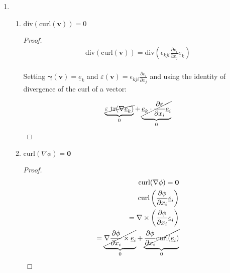 \begin{problem}
    \noindent
    \normalfont
\end{problem}
    \begin{enumerate}
        \item
        \begin{enumerate}
            
        \item $\text{div}(\text{curl}(\mathbf{v}))=0$
            \begin{proof}
                \begin{align}
                    \text{div}(\text{curl}(\mathbf{v}))=\text{div}\left( \epsilon_{kji}\frac{ \partial v_{i} }{ \partial x_{j} } \underline{e}_{k} \right) \\
                    \end{align}
                    
                    Setting $\mathbf{\gamma}(\mathbf{v})=\underline{e}_{k}$ and $\varepsilon(\mathbf{v})=\epsilon_{kji}\frac{ \partial v_{i} }{ \partial x_{j} }$ and using the identity of divergence of the curl of a vector:
        
                    \begin{align}
                    \underbrace{ \cancel{ \varepsilon \ \text{tr}(\nabla \underline{e}_{k}) } }_{ 0 }+\underbrace{ \cancel{ \underline{e}_{k}\cdot \frac{ \partial \varepsilon }{ \partial x_{i} } \underline{e}_{i} } }_{ 0 }    
                    \end{align}
            \end{proof}
            


        \item $\text{curl}(\nabla \phi)=\mathbf{0}$
        \begin{proof}
            \begin{align}
                \text{curl}(\nabla \phi)=\mathbf{0} \\
                \text{curl}\left( \frac{ \partial \phi }{ \partial x_{i} } \underline{e}_{i} \right) \\
                =\nabla \times\left( \frac{ \partial \phi }{ \partial x_{i} } \underline{e}_{i} \right) \\
                =\underbrace{ \cancel{ \nabla \frac{ \partial \phi }{ \partial x_{i} } \times \underline{e}_{i} } }_{ 0 }+\underbrace{ \cancel{ \frac{ \partial \phi }{ \partial x_{i} } \text{curl}(\underline{e}_{i}) } }_{ 0 }
                \end{align}
        \end{proof}


\end{enumerate}
\end{enumerate}
